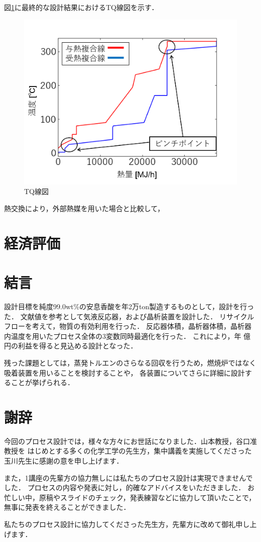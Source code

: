\documentclass[a4j]{jsreport}
\begin{document}
図\ref{TQ線図}に最終的な設計結果におけるTQ線図を示す．
\begin{figure}[htbp]
    \begin{center}
        \includegraphics[scale=0.7]{TQdiagram.png}
        \caption{TQ線図}
        \label{TQ線図}
    \end{center}
\end{figure}

熱交換により，外部熱媒を用いた場合と比較して，

\newpage
\chapter{経済評価}

\newpage
\chapter{結言}
設計目標を純度99.0wt\%の安息香酸を年2万ton製造するものとして，設計を行った．
文献値を参考として気液反応器，および晶析装置を設計した．
リサイクルフローを考えて，物質の有効利用を行った．
反応器体積，晶析器体積，晶析器内温度を用いたプロセス全体の3変数同時最適化を行った．
これにより，年 億円の利益を得ると見込める設計となった．
\par
残った課題としては，蒸発トルエンのさらなる回収を行うため，燃焼炉ではなく吸着装置を用いることを検討することや，
各装置についてさらに詳細に設計することが挙げられる．

\newpage
\chapter*{謝辞}
今回のプロセス設計では，様々な方々にお世話になりました．山本教授，谷口准教授を
はじめとする多くの化学工学の先生方，集中講義を実施してくださった玉川先生に感謝の意を申し上げます．
\par
また，1講座の先輩方の協力無しには私たちのプロセス設計は実現できませんでした．
プロセスの内容や発表に対し，的確なアドバイスをいただきました．
お忙しい中，原稿やスライドのチェック，発表練習などに協力して頂いたことで，無事に発表を終えることができました．
\par
私たちのプロセス設計に協力してくださった先生方，先輩方に改めて御礼申し上げます．
\end{document}
